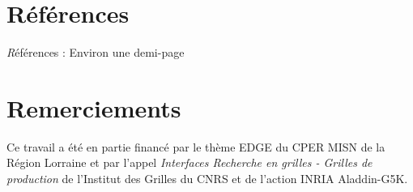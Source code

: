 \documentclass[a4paper,11pt]{article}
\newcommand{\todo}[1]{{\color{red}\textsl #1}}
\begin{document}
\section{Références}
\todo{Références : Environ une demi-page}



\section*{Remerciements}

Ce travail a été en partie financé par le thème EDGE du CPER MISN de la Région
Lorraine et par l'appel \textsl{Interfaces Recherche en grilles - Grilles de
production} de l'Institut des Grilles du CNRS et de l'action INRIA Aladdin-G5K.
\end{document}
